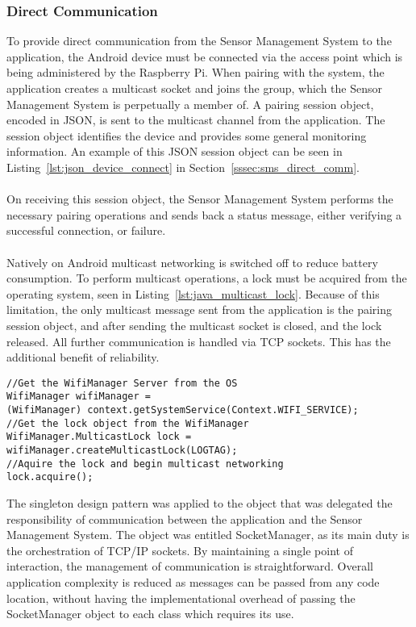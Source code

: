 \documentclass{article}
\begin{document}
\subsubsection{Direct Communication}	
To provide direct communication from the Sensor Management System to the application, the Android device must be connected via the access point which is being administered by the Raspberry Pi. When pairing with the system, the application creates a multicast socket and joins the group, which the Sensor Management System is perpetually a member of. A pairing session object, encoded in JSON, is sent to the multicast channel from the application. The session object identifies the device and provides some general monitoring information. An example of this JSON session object can be seen in Listing~\ref{lst:json_device_connect} in Section~\ref{sssec:sms_direct_comm}. \\\\
On receiving this session object, the Sensor Management System performs the necessary pairing operations and sends back a status message, either verifying a successful connection, or failure. \\\\
Natively on Android multicast networking is switched off to reduce battery consumption. To perform multicast operations, a lock must be acquired from the operating system, seen in Listing~\ref{lst:java_multicast_lock}. Because of this limitation, the only multicast message sent from the application is the pairing session object, and after sending the multicast socket is closed, and the lock released. All further communication is handled via TCP sockets. This has the additional benefit of reliability.
\begin{lstlisting}[caption={Multicast lock acquisition},label={lst:java_multicast_lock}]
//Get the WifiManager Server from the OS
WifiManager wifiManager = 
(WifiManager) context.getSystemService(Context.WIFI_SERVICE);
//Get the lock object from the WifiManager
WifiManager.MulticastLock lock = wifiManager.createMulticastLock(LOGTAG);
//Aquire the lock and begin multicast networking
lock.acquire();
\end{lstlisting}	
The singleton design pattern was applied to the object that was delegated the responsibility of communication between the application and the Sensor Management System. The object was entitled SocketManager, as its main duty is the orchestration of TCP/IP sockets. By maintaining a single point of interaction, the management of communication is straightforward. Overall application complexity is reduced as messages can be passed from any code location, without having the implementational overhead of passing the SocketManager object to each class which requires its use. \\\\
\end{document}
